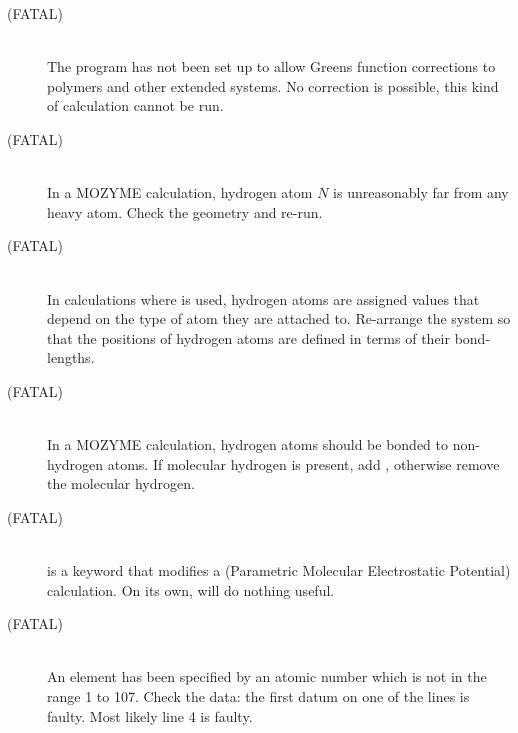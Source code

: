 \begin{description}
\item[ (FATAL)]~\\
The program has not been set up to allow Greens function corrections to
polymers and other extended systems.  No correction is possible, this kind of
calculation cannot be run.

\item[ (FATAL)]~\\
In a MOZYME calculation, hydrogen atom $N$ is unreasonably far from any heavy
atom. Check the geometry and re-run.

\item[ (FATAL)]~\\
In  calculations where  is used, hydrogen atoms are  assigned
values that depend on the type of atom they are attached to.  Re-arrange the
system so that the positions of hydrogen atoms are defined in terms of their
bond-lengths.

\item[ (FATAL)]~\\
In a MOZYME calculation, hydrogen atoms should be bonded to non-hydrogen atoms.
If molecular hydrogen is present, add , otherwise remove the molecular
hydrogen.

\item[ (FATAL)]~\\
 is a keyword that modifies a  (Parametric Molecular
Electrostatic Potential) calculation.  On its own,  will do nothing
useful.

\item[ (FATAL)]~\\
An element has been specified by an atomic number which is  not  in the  range 
1  to  107.   Check the data:  the first datum on one of the lines is faulty. 
Most likely line 4 is faulty.
                  

\end{description}
